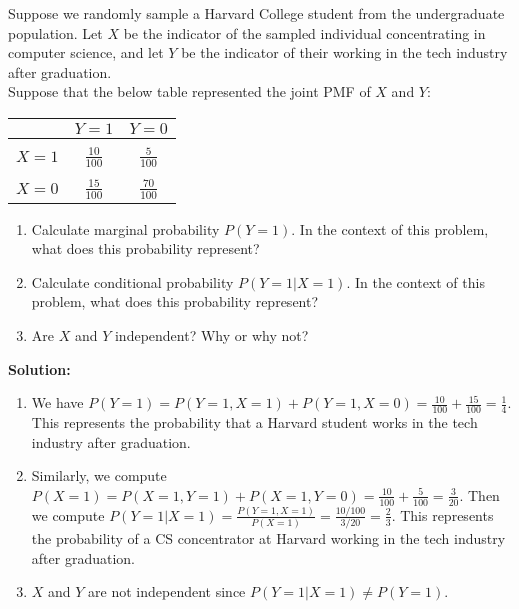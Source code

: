 \documentclass{harvardml}
\theoremstyle{definition}
\theoremstyle{plain}
\begin{document}
\begin{problem}

Suppose we randomly sample a Harvard College student from the undergraduate population.  Let $X$ be the indicator of the sampled individual concentrating in computer science, and let $Y$ be the indicator of their working in the tech industry after graduation.\\

Suppose that the below table represented the joint PMF of $X$ and $Y$:

\begin{center}
\begin{tabular}{ c | c c }
  & $Y = 1$ & $Y = 0$ \\ \hline\\
 $X = 1$ & $\frac{10}{100}$ & $\frac{5}{100}$ \\  \\
 $X = 0$ & $\frac{15}{100}$ & $\frac{70}{100}$ \\   
\end{tabular}
\end{center}

\begin{enumerate}[label=(\alph*)] 
\item Calculate marginal probability $P(Y = 1)$.  In the context of this problem, what does this probability represent?
\item Calculate conditional probability $P(Y = 1 | X = 1)$.  In the context of this problem, what does this probability represent?
\item Are $X$ and $Y$ independent?  Why or why not?

\end{enumerate}

\noindent \textbf{Solution:}
\begin{enumerate}[label=(\alph*)]
    \item We have $P(Y=1) = P(Y=1, X=1) + P(Y=1, X=0) = \frac{10}{100} + \frac{15}{100} = \frac{1}{4}$. This represents the probability that a Harvard student works in the tech industry after graduation.
    \item Similarly, we compute $P(X=1) = P(X=1, Y=1) + P(X=1, Y=0) = \frac{10}{100} + \frac{5}{100} = \frac{3}{20}$. Then we compute $P(Y=1 | X=1) = \frac{P(Y=1, X=1)}{P(X=1)} = \frac{10/100}{3/20} = \frac{2}{3}.$ This represents the probability of a CS concentrator at Harvard working in the tech industry after graduation.
    \item $X$ and $Y$ are not independent since $P(Y=1|X=1) \neq P(Y=1).$
\end{enumerate}

\end{problem}
\end{document}
